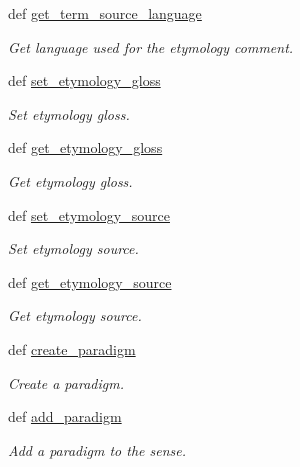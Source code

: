\begin{DoxyCompactItemize}
def \hyperlink{classlmf_1_1src_1_1core_1_1sense_1_1_sense_ab6f704b6dd461728169ffb3c74e43896}{get\+\_\+term\+\_\+source\+\_\+language}
\begin{DoxyCompactList}\small\item\em Get language used for the etymology comment. \end{DoxyCompactList}\item 
def \hyperlink{classlmf_1_1src_1_1core_1_1sense_1_1_sense_a2008e37c341cb4bb59bae4ed74bddef2}{set\+\_\+etymology\+\_\+gloss}
\begin{DoxyCompactList}\small\item\em Set etymology gloss. \end{DoxyCompactList}\item 
def \hyperlink{classlmf_1_1src_1_1core_1_1sense_1_1_sense_adb7c6fd2e19771361a94025df3343a58}{get\+\_\+etymology\+\_\+gloss}
\begin{DoxyCompactList}\small\item\em Get etymology gloss. \end{DoxyCompactList}\item 
def \hyperlink{classlmf_1_1src_1_1core_1_1sense_1_1_sense_ad869f9c4fcfca1775a74f6e1370c3476}{set\+\_\+etymology\+\_\+source}
\begin{DoxyCompactList}\small\item\em Set etymology source. \end{DoxyCompactList}\item 
def \hyperlink{classlmf_1_1src_1_1core_1_1sense_1_1_sense_a58b3a4780ebc7fec50bd5088fef02d87}{get\+\_\+etymology\+\_\+source}
\begin{DoxyCompactList}\small\item\em Get etymology source. \end{DoxyCompactList}\item 
def \hyperlink{classlmf_1_1src_1_1core_1_1sense_1_1_sense_ac61f3aadccb06f636aad9891b3bba53e}{create\+\_\+paradigm}
\begin{DoxyCompactList}\small\item\em Create a paradigm. \end{DoxyCompactList}\item 
def \hyperlink{classlmf_1_1src_1_1core_1_1sense_1_1_sense_ae67664c5b120e407e5d0543ad5bdfb3d}{add\+\_\+paradigm}
\begin{DoxyCompactList}\small\item\em Add a paradigm to the sense. \end{DoxyCompactList}\item 

\end{DoxyCompactItemize}
